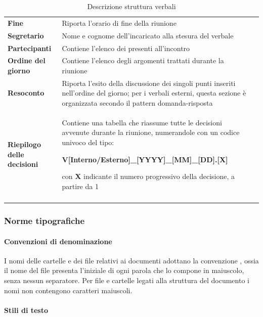 {\begin{longtable}{L{.210\freewidth} L{.6\freewidth} L{.080\freewidth}}
		\textbf{Fine} & Riporta l'orario di fine della riunione \\
		\textbf{Segretario} & Nome e cognome dell'incaricato alla stesura del verbale \\
		\textbf{Partecipanti} & Contiene l'elenco dei presenti all'incontro \\  
		\textbf{Ordine del giorno} & Contiene l'elenco degli argomenti trattati durante la riunione \\
		\textbf{Resoconto} & Riporta l'esito della discussione dei singoli punti inseriti nell'ordine del giorno; per i verbali esterni, questa sezione è organizzata secondo il pattern domanda-risposta \\
		\textbf{Riepilogo delle decisioni} & Contiene una tabella che riassume tutte le decisioni avvenute durante la riunione, numerandole con un codice univoco del tipo: 
	\centerline{\textbf{V[Interno/Esterno]\_[YYYY]\_[MM]\_[DD].[X]}} con \textbf{X} indicante il numero progressivo della decisione, a partire da 1 \\		
		
		\bottomrule
		\hiderowcolors
		\caption{Descrizione struttura verbali}
	\end{longtable}


\subsubsection{Norme tipografiche}
\paragraph*{Convenzioni di denominazione}   
I nomi delle cartelle e dei file relativi ai documenti adottano la convenzione , ossia il nome del file presenta l'iniziale di ogni parola che lo compone in maiuscolo, senza nessun separatore. Per file e cartelle legati alla struttura del documento i nomi non contengono caratteri maiuscoli. 
\paragraph*{Stili di testo} 


}
